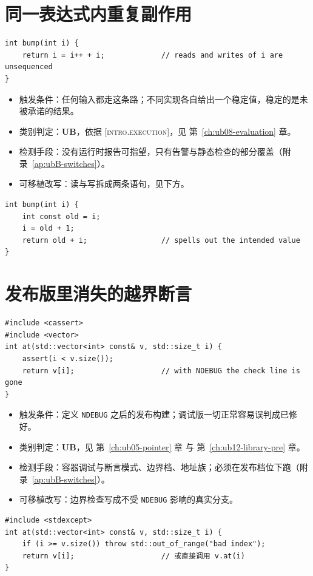 \documentclass[12pt,a4paper,fontset=fandol]{ctexbook}
\newcommand{\Tp}[1]{\texttt{#1}}
\newcommand{\Bk}{\discretionary{}{}{}}
\newcommand{\UB}{\textbf{\textsf{UB}}}
\newcommand{\Std}[1]{\textsc{[#1]}}
\begin{document}
\section{同一表达式内重复副作用}
\begin{lstlisting}[style=cppstyle, caption={反例：一个表达式里对同一标量既读又写}]
int bump(int i) {
    return i = i++ + i;             // reads and writes of i are unsequenced
}
\end{lstlisting}
\begin{itemize}
\item 触发条件：任何输入都走这条路；不同实现各自给出一个稳定值，稳定的是未被承诺的结果。
\item 类别判定：\UB{}，依据 \Std{intro{\Bk}.ex{\Bk}ecution}，见 第~\ref{ch:ub08-evaluation} 章。
\item 检测手段：没有运行时报告可指望，只有告警与静态检查的部分覆盖（附录~\ref{ap:ubB-switches}）。
\item 可移植改写：读与写拆成两条语句，见下方。
\end{itemize}
\begin{lstlisting}[style=cppstyle, caption={改写：一语句一意图}]
int bump(int i) {
    int const old = i;
    i = old + 1;
    return old + i;                 // spells out the intended value
}
\end{lstlisting}

\section{发布版里消失的越界断言}
\begin{lstlisting}[style=cppstyle, caption={反例：边界检查写在断言里}]
#include <cassert>
#include <vector>
int at(std::vector<int> const& v, std::size_t i) {
    assert(i < v.size());
    return v[i];                    // with NDEBUG the check line is gone
}
\end{lstlisting}
\begin{itemize}
\item 触发条件：定义 \Tp{NDEBUG} 之后的发布构建；调试版一切正常容易误判成已修好。
\item 类别判定：\UB{}，见 第~\ref{ch:ub05-pointer} 章 与 第~\ref{ch:ub12-library-pre} 章。
\item 检测手段：容器调试与断言模式、边界档、地址族；必须在发布档位下跑（附录~\ref{ap:ubB-switches}）。
\item 可移植改写：边界检查写成不受 \Tp{NDEBUG} 影响的真实分支。
\end{itemize}
\begin{lstlisting}[style=cppstyle, caption={改写：越界是错误路径，不是断言}]
#include <stdexcept>
int at(std::vector<int> const& v, std::size_t i) {
    if (i >= v.size()) throw std::out_of_range("bad index");
    return v[i];                    // 或直接调用 v.at(i)
}
\end{lstlisting}
\end{document}
